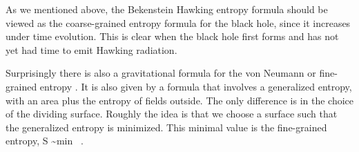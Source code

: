 


As we mentioned above,  the Bekenstein Hawking entropy formula should be viewed as the coarse-grained entropy formula for the black hole, since it increases under time evolution. This is clear when the black hole first forms and has not yet had time to emit Hawking radiation. 

Surprisingly there is also a gravitational formula for the von Neumann or fine-grained entropy  \cite{Ryu:2006bv,Hubeny:2007xt,Faulkner:2013ana,Engelhardt:2014gca}. It is also given by a formula that involves a generalized entropy, with an area plus the entropy of fields outside. The only difference is in the choice of the dividing surface. Roughly the idea is that we choose a surface such that the generalized entropy is minimized. This minimal value is the fine-grained entropy,   
\be {}
 S \sim {\rm min}   \ .
 \ee 
 
